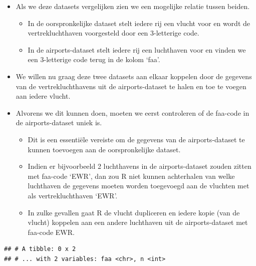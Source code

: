 \documentclass[]{tufte-book}
\newenvironment{Shaded}{}{}
\newcommand{\DecValTok}[1]{\textcolor[rgb]{0.25,0.63,0.44}{#1}}
\newcommand{\KeywordTok}[1]{\textcolor[rgb]{0.00,0.44,0.13}{\textbf{#1}}}
\newcommand{\NormalTok}[1]{#1}
\newcommand{\OperatorTok}[1]{\textcolor[rgb]{0.40,0.40,0.40}{#1}}
\newcommand{\StringTok}[1]{\textcolor[rgb]{0.25,0.44,0.63}{#1}}
\providecommand{\tightlist}{%
  \setlength{\itemsep}{0pt}\setlength{\parskip}{0pt}}
\begin{document}
\begin{itemize}
\tightlist
\item
  Als we deze datasets vergelijken zien we een mogelijke relatie tussen beiden.

  \begin{itemize}
  \tightlist
  \item
    In de oorspronkelijke dataset stelt iedere rij een vlucht voor en wordt de vertrekluchthaven voorgesteld door een 3-letterige code.
  \item
    In de airports-dataset stelt iedere rij een luchthaven voor en vinden we een 3-letterige code terug in de kolom `faa'.
  \end{itemize}
\item
  We willen nu graag deze twee datasets aan elkaar koppelen door de gegevens van de vertrekluchthavens uit de airports-dataset te halen en toe te voegen aan iedere vlucht.
\item
  Alvorens we dit kunnen doen, moeten we eerst controleren of de faa-code in de airports-dataset uniek is.

  \begin{itemize}
  \tightlist
  \item
    Dit is een essentiële vereiste om de gegevens van de airports-dataset te kunnen toevoegen aan de oorspronkelijke dataset.
  \item
    Indien er bijvoorbeeld 2 luchthavens in de airports-dataset zouden zitten met faa-code `EWR', dan zou R niet kunnen achterhalen van welke luchthaven de gegevens moeten worden toegevoegd aan de vluchten met als vertrekluchthaven `EWR'.
  \item
    In zulke gevallen gaat R de vlucht dupliceren en iedere kopie (van de vlucht) koppelen aan een andere luchthaven uit de airports-dataset met faa-code EWR.
  \end{itemize}
\end{itemize}

\begin{Shaded}
\end{Shaded}

\begin{verbatim}
## # A tibble: 0 x 2
## # ... with 2 variables: faa <chr>, n <int>
\end{verbatim}
\end{document}
